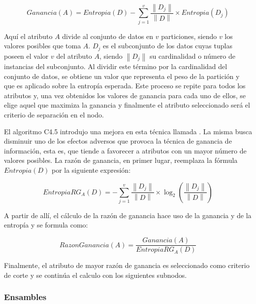 \begin{equation}
   Ganancia(A) = Entropia(D) 
   - \sum_{j=1}^{v} \frac{\left\| D_{j} \right\|}{\left\| D \right\|} 
   \times Entropia(D_{j})
\end{equation}

Aquí el atributo $A$ divide al conjunto de datos en $v$ particiones, siendo $v$
los valores posibles que toma $A$. $D_{j}$ es el subconjunto de los datos cuyas
tuplas poseen el valor $v$ del atributo $A$, siendo $\left\|D_{j}\right\|$ su
cardinalidad o número de instancias del subconjunto. Al dividir este término por
la cardinalidad del conjunto de datos, se obtiene un valor que representa el
peso de la partición y que es aplicado sobre la entropía esperada. Este proceso
se repite para todos los atributos y, una vez obtenidos los valores de ganancia
para cada uno de ellos, se elige aquel que maximiza la ganancia y finalmente el
atributo seleccionado será el criterio de separación en el nodo.

El algoritmo C4.5 introdujo una mejora en esta técnica llamada . La misma busca disminuir uno de los efectos adversos que provoca
la técnica de ganancia de información, esta es, que tiende a favorecer a
atributos con un mayor número de valores posibles. La razón de ganancia, en
primer lugar, reemplaza la fórmula $Entropia(D)$ por la siguiente expresión: 

\begin{equation}
   EntropiaRG_{A}(D) = - \sum_{j=1}^{v} \frac{\left\| D_{j} \right\|}{\left\| D \right\|} 
   \times \log_{2}(\frac{\left\| D_{j} \right\|}{\left\| D \right\|})
\end{equation}

A partir de allí, el cálculo de la razón de ganancia hace uso de la ganancia y
de la entropía y se formula como:

\begin{equation} \label{eq:gan_c45}
   RazonGanancia(A) = \frac{Ganancia(A)}{EntropiaRG_{A}(D)} 
\end{equation}

Finalmente, el atributo de mayor razón de ganancia es seleccionado como criterio
de corte y se continúa el calculo con los siguientes subnodos.


\subsubsection{Ensambles} 

